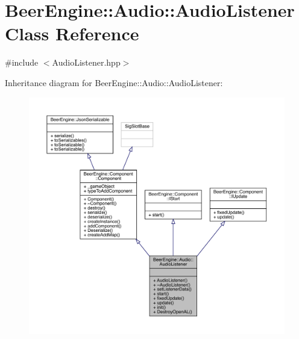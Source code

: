 \hypertarget{class_beer_engine_1_1_audio_1_1_audio_listener}{}\section{Beer\+Engine\+:\+:Audio\+:\+:Audio\+Listener Class Reference}
\label{class_beer_engine_1_1_audio_1_1_audio_listener}


{\ttfamily \#include $<$Audio\+Listener.\+hpp$>$}



Inheritance diagram for Beer\+Engine\+:\+:Audio\+:\+:Audio\+Listener\+:\nopagebreak
\begin{figure}[H]
\begin{center}
\leavevmode
\includegraphics[width=350pt]{class_beer_engine_1_1_audio_1_1_audio_listener__inherit__graph}
\end{center}
\end{figure}


